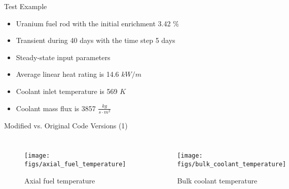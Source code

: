 \documentclass[11pt]{beamer}
\begin{document}
\begin{frame}{Test Example}
  
  \footnotesize

  \begin{block}{}
    \begin{itemize}
    \item Uranium fuel rod with the initial enrichment 3.42 $\%$
    \item Transient during 40 days with the time step 5 days
    \item Steady-state input parameters
    \item Average linear heat rating is 14.6 $kW/m$
    \item Coolant inlet temperature is 569 $K$
    \item Coolant mass flux is 3857 $\frac{kg}{s \cdot m^2}$
    \end{itemize}
  \end{block}

\end{frame}



\begin{frame}{Modified vs. Original Code Versions (1)}
  \footnotesize 
  
  \begin{columns}[t]


  \begin{figure}[h]
    \texttt{[image: figs/axial\_fuel\_temperature]}
    \caption{Axial fuel temperature}
    \label{fig:tfuel}
  \end{figure}  


  \begin{figure}[h]
    \texttt{[image: figs/bulk\_coolant\_temperature]}    
    \caption{Bulk coolant temperature}
    \label{fig:tcool}
  \end{figure}  
  
  \end{columns}

\end{frame}
\end{document}
